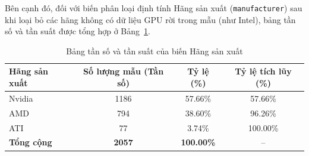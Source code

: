 \begin{table}[H]
    \centering
    \footnotesize
    \setlength{\tabcolsep}{4.5pt}
    \caption{Các giá trị đặc trưng mẫu của các biến định lượng kỹ thuật GPU}
    \label{tab:gpu_descriptive_stats}
    \renewcommand{\arraystretch}{1.3}
\end{table}

Bên cạnh đó, đối với biến phân loại định tính Hãng sản xuất (\texttt{manufacturer}) sau khi loại bỏ các hãng không có dữ liệu GPU rời trong mẫu (như Intel), bảng tần số và tần suất được tổng hợp ở Bảng~\ref{tab:freq_manufacturer}.

\begin{table}[H]
    \centering
    \small
    \caption{Bảng tần số và tần suất của biến Hãng sản xuất}
    \label{tab:freq_manufacturer}
    \renewcommand{\arraystretch}{1.25}
    \begin{tabular}{|l|c|c|c|}
        \hline
        \rowcolor{TableHead}
        \textbf{Hãng sản xuất} & \textbf{Số lượng mẫu (Tần số)} & \textbf{Tỷ lệ (\%)} & \textbf{Tỷ lệ tích lũy (\%)} \\ \hline
        Nvidia & 1186 & 57.66\% & 57.66\% \\ \hline
        AMD & 794 & 38.60\% & 96.26\% \\ \hline
        ATI & 77 & 3.74\% & 100.00\% \\ \hline
        \textbf{Tổng cộng} & \textbf{2057} & \textbf{100.00\%} & -- \\ \hline
    \end{tabular}
\end{table}

